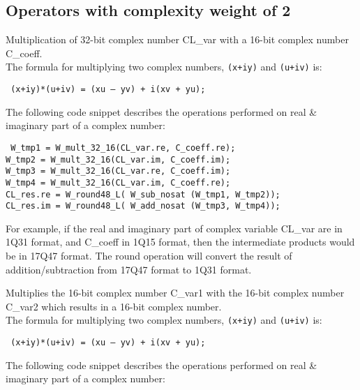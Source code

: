 \subsection{Operators with complexity weight of 2}


Multiplication of 32-bit complex number CL\_var with a 16-bit complex number C\_coeff.\\
The formula for multiplying two complex numbers, {\tt (x+iy)} and {\tt (u+iv)} is:

{\tt {} (x+iy)*(u+iv) = (xu – yv) + i(xv + yu);}

The following code snippet describes the operations performed on real \& imaginary part of a complex number:

{\tt {} W\_tmp1 = W\_mult\_32\_16(CL\_var.re, C\_coeff.re);\\
 W\_tmp2 = W\_mult\_32\_16(CL\_var.im, C\_coeff.im);\\
 W\_tmp3 = W\_mult\_32\_16(CL\_var.re, C\_coeff.im);\\
 W\_tmp4 = W\_mult\_32\_16(CL\_var.im, C\_coeff.re);\\

 CL\_res.re = W\_round48\_L( W\_sub\_nosat (W\_tmp1, W\_tmp2));\\
 CL\_res.im = W\_round48\_L( W\_add\_nosat (W\_tmp3, W\_tmp4));
}

For example, if the real and imaginary part of complex variable CL\_var are in 1Q31 format, and C\_coeff in 1Q15 format, then the intermediate products would be in 17Q47 format.
The round operation will convert the result of addition/subtraction from 17Q47 format to 1Q31 format.


Multiplies the 16-bit complex number C\_var1 with the 16-bit complex number C\_var2 which results in a 16-bit complex number.\\
The formula for multiplying two complex numbers, {\tt (x+iy)} and {\tt (u+iv)} is:

{\tt {} (x+iy)*(u+iv) = (xu – yv) + i(xv + yu);}

The following code snippet describes the operations performed on real \& imaginary part of a complex number:

